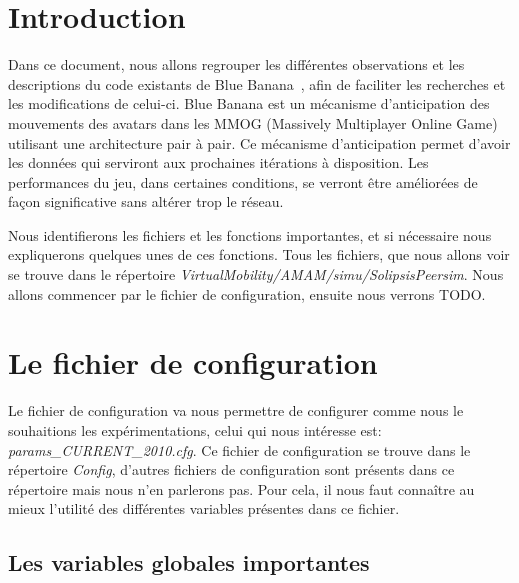 \documentclass[11pt,a4paper]{article}
\begin{document}

\newpage
\tableofcontents
\newpage



\section{Introduction}
\par Dans ce document, nous allons regrouper les différentes observations et les descriptions du code existants de Blue Banana~\cite{191}, afin de faciliter les recherches et les modifications de celui-ci. Blue Banana est un mécanisme d'anticipation des mouvements des avatars dans les MMOG (Massively Multiplayer Online Game) utilisant une architecture pair à pair. Ce mécanisme d'anticipation permet d'avoir les données qui serviront aux prochaines itérations à disposition. Les performances du jeu, dans certaines conditions, se verront être améliorées de façon significative sans altérer trop le réseau.
\par Nous identifierons les fichiers et les fonctions importantes, et si nécessaire nous expliquerons quelques unes de ces fonctions. Tous les fichiers, que nous allons voir se trouve dans le répertoire \textit{VirtualMobility/AMAM/simu/SolipsisPeersim}. Nous allons commencer par le fichier de configuration, ensuite nous verrons TODO.

\newpage
\section{Le fichier de configuration}
\par Le fichier de configuration va nous permettre de configurer comme nous le souhaitions les expérimentations, celui qui nous intéresse est: \textit{params\_CURRENT\_2010.cfg}. Ce fichier de configuration se trouve dans le répertoire \textit{Config}, d'autres fichiers de configuration sont présents dans ce répertoire mais nous n'en parlerons pas. Pour cela, il nous faut connaître au mieux l'utilité des différentes variables présentes dans ce fichier.

\subsection{Les variables globales importantes}
\end{document}
